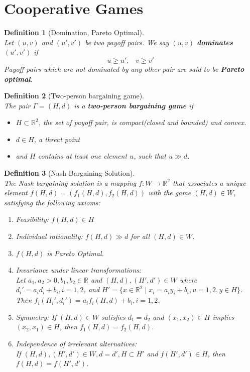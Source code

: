 \documentclass[12pt]{article}
\newtheorem{definition}{Definition}[section]
\theoremstyle{definition}
\begin{document}
\section{Cooperative Games}
\begin{definition}[Domination, Pareto Optimal]
\hfill\\\normalfont Let $(u, v)$ and $(u', v')$ be two payoff pairs. We say $(u, v)$ \textbf{dominates} $(u', v')$ if
\[
u\geq u',\;\;\; v\geq v'
\]
Payoff pairs which are not dominated by any other pair are said to be \textbf{Pareto optimal}.
\end{definition}
\begin{definition}[Two-person bargaining game]
\hfill\\\normalfont The pair $\Gamma = (H, d)$ is a \textbf{two-person bargaining game} if
\begin{itemize}
  \item $H\subset \mathbb{R}^2$, the set of payoff pair, is compact(closed and bounded) and convex.
  \item $d\in H$, a threat point
  \item and $H$ contains at least one element $u$, such that $u\gg d$.
\end{itemize}
\end{definition}
\begin{definition}[Nash Bargaining Solution]
\hfill\\\normalfont The Nash bargaining solution is a mapping $f: W\to \mathbb{R}^2$ that associates a unique element $f(H, d)=(f_1(H,d), f_2(H, d))$ with the game $(H, d)\in W$, satisfying the following axioms:
\begin{enumerate}
  \item Feasibility: $f(H,d)\in H$
  \item Individual rationality: $f(H, d)\gg d$ for all $(H, d)\in W$.
  \item $f(H, d)$ is Pareto Optimal.
  \item Invariance under linear transformations:\\
  Let $a_1, a_2>0, b_1, b_2\in \mathbb{R}$ and $(H, d), (H', d')\in W$ where $d_i'=a_id_i+b_i, i=1,2$, and $H'=\{x\in \mathbb{R}^2\mid x_i=a_iy_i+b_i, u=1, 2, y\in H\}$. Then $f_i(H_i', d_i')=a_if_i(H, d)+b_i, i=1,2$.
  \item Symmetry: If $(H, d)\in W$ satisfies $d_1=d_2$ and $(x_1, x_2)\in H$ implies $(x_2, x_1)\in H$, then $f_1(H, d)=f_2(H,d)$.
  \item Independence of irrelevant alternatives:\\
  If $(H, d), (H', d')\in W, d=d', H\subset H'$ and $f(H', d')\in H$, then $f(H, d)=f(H', d')$.
\end{enumerate}
\end{definition}
\end{document}
